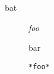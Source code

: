 \begin{description}
\item[bat]

\emph{foo}

bar

\begin{verbatim}
*foo*
\end{verbatim}
\end{description}
